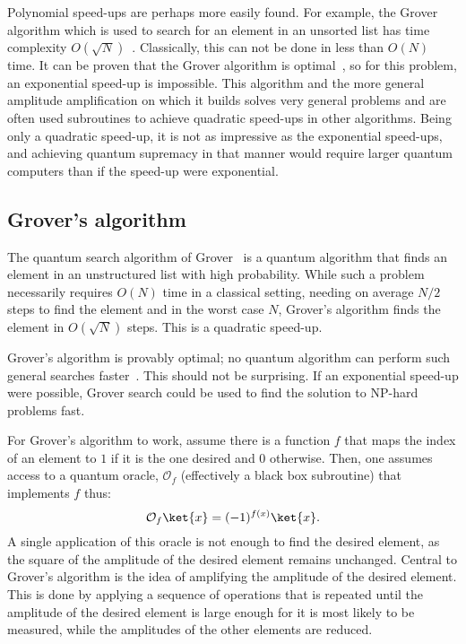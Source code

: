 Polynomial speed-ups are perhaps more easily found.
For example, the Grover algorithm which is used to search for an element in an unsorted list has time complexity $O(\sqrt{N})$~\autocite{grover1996}.
Classically, this can not be done in less than $O(N)$ time.
It can be proven that the Grover algorithm is optimal~\autocite{zalka1999}, so for this problem, an exponential speed-up is impossible.
This algorithm and the more general amplitude amplification on which it builds solves very general problems and are often used subroutines to achieve quadratic speed-ups in other algorithms.
Being only a quadratic speed-up, it is not as impressive as the exponential speed-ups, and achieving quantum supremacy in that manner would require larger quantum computers than if the speed-up were exponential.


\subsection{Grover's algorithm}
The quantum search algorithm of Grover~\autocite{grover1996} is a quantum algorithm that finds an element in an unstructured list with high probability.
While such a problem necessarily requires $O(N)$ time in a classical setting, needing on average $N/2$ steps to find the element and in the worst case $N$, Grover's algorithm finds the element in $O(\sqrt{N})$ steps.
This is a quadratic speed-up.

Grover's algorithm is provably optimal; no quantum algorithm can perform such general searches faster~\autocite{zalka1999}.
This should not be surprising.
If an exponential speed-up were possible, Grover search could be used to find the solution to NP-hard problems fast.

For Grover's algorithm to work, assume there is a function $f$ that maps the index of an element to $1$ if it is the one desired and $0$ otherwise.
Then, one assumes access to a quantum oracle, $\mathcal{O}_f$
(effectively a black box subroutine) that implements $f$ thus:
\begin{equation}
    \label{eq:grover_oracle}
    \mathcal{O}_f \ket{x} = (-1)^{f(x)} \ket{x}.
\end{equation}
A single application of this oracle is not enough to find the desired element, as the square of the amplitude of the desired element remains unchanged.
Central to Grover's algorithm is the idea of amplifying the amplitude of the desired element.
This is done by applying a sequence of operations that is repeated until the amplitude of the desired element is large enough for it is most likely to be measured, while the amplitudes of the other elements are reduced.

